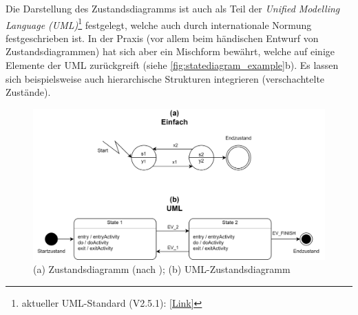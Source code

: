 \documentclass[a4paper, portrait, 12pt]{scrartcl} %
\begin{document}
Die Darstellung des Zustandsdiagramms ist auch als Teil der \emph{Unified Modelling Language (UML)}\footnote{aktueller UML-Standard (V2.5.1): \href{https://www.omg.org/spec/UML/2.5.1/About-UML}{[Link]}} festgelegt, welche auch durch internationale Normung festgeschrieben ist. In der Praxis (vor allem beim händischen Entwurf von Zustandsdiagrammen) hat sich aber ein Mischform bewährt, welche auf einige Elemente der UML zurückgreift (siehe \autoref{fig:statediagram_example}b). Es lassen sich beispielsweise auch hierarchische Strukturen integrieren (verschachtelte Zustände).

\begin{figure}[H]
	\centering
    \includegraphics[scale=0.12]{StateDiagram_example.png} 
	\caption{(a) Zustandsdiagramm (nach \cite{Baesig2019}); (b) UML-Zustandsdiagramm}
	\label{fig:statediagram_example}
\end{figure}
\end{document}
